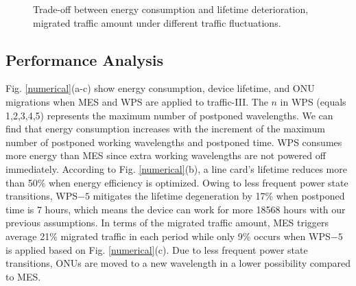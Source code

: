 \documentclass[letter]{IEEEtran}
\begin{document}
\begin{figure*}[h]
  \setlength{\abovecaptionskip}{-1.0mm}
    \centering 
    \caption{Trade-off between energy consumption and lifetime deterioration, migrated traffic amount under different traffic fluctuations.} 
    \label{numerical_2} 
    \vspace{-6.0mm}
\end{figure*}

\vspace{-5.0mm}
\subsection{Performance Analysis}
Fig. \ref{numerical}(a-c) show energy consumption, device lifetime, and ONU migrations when MES and WPS are applied to traffic-III. The $n$ in WPS (equals 1,2,3,4,5) represents the maximum number of postponed wavelengths. We can find that energy consumption increases with the increment of the maximum number of postponed working wavelengths and postponed time. WPS consumes more energy than MES since extra working wavelengths are not powered off immediately. According to Fig. \ref{numerical}(b), a line card's lifetime reduces more than 50\% when energy efficiency is optimized. Owing to less frequent power state transitions, WPS$ -5 $ mitigates the lifetime degeneration by 17\% when postponed time is 7 hours, which means the device can work for more 18568 hours with our previous assumptions. In terms of the migrated traffic amount, MES triggers average 21\% migrated traffic in each period while only 9\% occurs when WPS$ -5 $ is applied based on Fig. \ref{numerical}(c). Due to less frequent power state transitions, ONUs are moved to a new wavelength in a lower possibility compared to MES.
\end{document}
